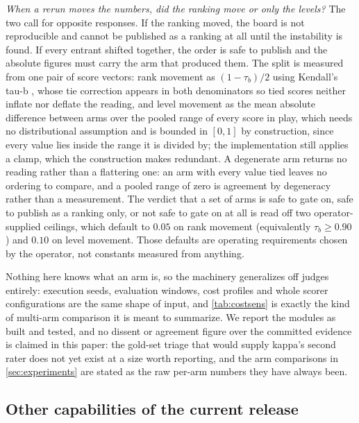 \emph{When a rerun moves the numbers, did the ranking move or only the levels?} The two call for opposite responses. If the ranking moved, the board is not reproducible and cannot be published as a ranking at all until the instability is found. If every entrant shifted together, the order is safe to publish and the absolute figures must carry the arm that produced them. The split is measured from one pair of score vectors: rank movement as $(1-\tau_b)/2$ using Kendall's tau-b \citep{kendall1938rank}, whose tie correction \citep{kendall1945ties} appears in both denominators so tied scores neither inflate nor deflate the reading, and level movement as the mean absolute difference between arms over the pooled range of every score in play, which needs no distributional assumption and is bounded in $[0,1]$ by construction, since every value lies inside the range it is divided by; the implementation still applies a clamp, which the construction makes redundant. A degenerate arm returns no reading rather than a flattering one: an arm with every value tied leaves no ordering to compare, and a pooled range of zero is agreement by degeneracy rather than a measurement. The verdict that a set of arms is safe to gate on, safe to publish as a ranking only, or not safe to gate on at all is read off two operator-supplied ceilings, which default to $0.05$ on rank movement (equivalently $\tau_b \ge 0.90$) and $0.10$ on level movement. Those defaults are operating requirements chosen by the operator, not constants measured from anything.

Nothing here knows what an arm is, so the machinery generalizes off judges entirely: execution seeds, evaluation windows, cost profiles and whole scorer configurations are the same shape of input, and \cref{tab:costsens} is exactly the kind of multi-arm comparison it is meant to summarize. We report the modules as built and tested, and no dissent or agreement figure over the committed evidence is claimed in this paper: the gold-set triage that would supply kappa's second rater does not yet exist at a size worth reporting, and the arm comparisons in \cref{sec:experiments} are stated as the raw per-arm numbers they have always been.

\subsection{Other capabilities of the current release}\label{app:capabilities}

